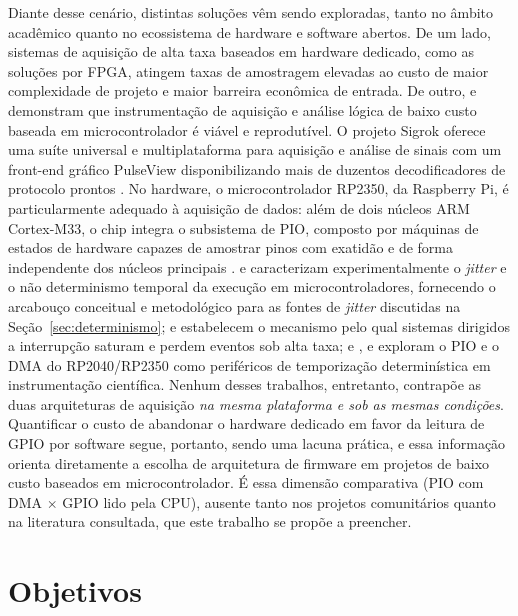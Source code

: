 Diante desse cenário, distintas soluções vêm sendo exploradas, tanto no
âmbito acadêmico quanto no ecossistema de hardware e software abertos. De um
lado, sistemas de aquisição de alta taxa baseados em hardware dedicado, como
as soluções por \ac{FPGA}, atingem taxas de amostragem elevadas ao custo de
maior complexidade de projeto e maior barreira econômica de entrada. De outro,
 e  demonstram que
instrumentação de aquisição e análise lógica de baixo custo baseada em
microcontrolador é viável e reprodutível. O projeto Sigrok oferece uma suíte
universal e multiplataforma para aquisição e análise de sinais com um front-end
gráfico PulseView disponibilizando mais de duzentos decodificadores de
protocolo prontos \cite{sigrok2026}. No hardware, o microcontrolador RP2350, da
Raspberry Pi, é particularmente adequado à aquisição de dados: além de dois
núcleos ARM Cortex-M33, o chip integra o subsistema de \ac{PIO},
composto por máquinas de estados de hardware capazes de amostrar pinos com
exatidão e de forma independente dos núcleos principais \cite{rpi2024ds}.
 e  caracterizam experimentalmente
o \emph{jitter} e o não determinismo temporal da execução em
microcontroladores, fornecendo o arcabouço conceitual e metodológico para as
fontes de \emph{jitter} discutidas na Seção~\ref{sec:determinismo};
 e  estabelecem o mecanismo pelo
qual sistemas dirigidos a interrupção saturam e perdem eventos sob alta taxa; e
,  e 
exploram o \ac{PIO} e o \ac{DMA} do RP2040/RP2350 como periféricos de
temporização determinística em instrumentação científica. Nenhum desses
trabalhos, entretanto, contrapõe as duas arquiteturas de aquisição \emph{na
      mesma plataforma e sob as mesmas condições}. Quantificar o custo de abandonar o
hardware dedicado em favor da leitura de \ac{GPIO} por software segue,
portanto, sendo uma lacuna prática, e essa informação orienta diretamente a
escolha de arquitetura de firmware em projetos de baixo custo baseados em
microcontrolador. É essa dimensão comparativa (\ac{PIO} com \ac{DMA} $\times$
\ac{GPIO} lido pela \ac{CPU}), ausente tanto nos projetos comunitários quanto
na literatura consultada, que este trabalho se propõe a preencher.

\section{Objetivos}

